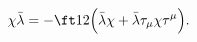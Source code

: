 \begin{equation}
\chi \bar{\lambda}=-\ft12\Bigl(\bar{\lambda}\chi + \bar{\lambda}\tau_\mu \chi \tau^\mu \Bigr).
\end{equation}

